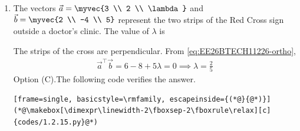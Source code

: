\begin{enumerate}[label=\thesubsection.\arabic*, ref=\thesubsection.\theenumi]
\item The vectors $\vec{a} = \myvec{3 \\ 2 \\ \lambda}$ and $\vec{b} = \myvec{2 \\ -4 \\ 5}$ represent the two strips of the Red Cross sign outside a doctor's clinic. The value of $\lambda$ is
\begin{enumerate}[label=(\Alph*)]
	\begin{multicols}{4}
	\item $1$
	\item $\frac{5}{2}$
	\item $\frac{2}{5}$
	\item $0$
	\end{multicols}
\end{enumerate}
\par\solution
The strips of the cross are perpendicular. From \eqref{eq:EE26BTECH11226-ortho},
\begin{align}
	\vec{a}^{\top}\vec{b} = 6 - 8 + 5\lambda = 0 \implies \lambda = \frac{2}{5}
\end{align}
Option (C).The following code verifies the answer.
\begin{lstlisting}[frame=single, basicstyle=\rmfamily, escapeinside={(*@}{@*)}]
(*@\makebox[\dimexpr\linewidth-2\fboxsep-2\fboxrule\relax][c]{codes/1.2.15.py}@*)
\end{lstlisting}

\end{enumerate}


